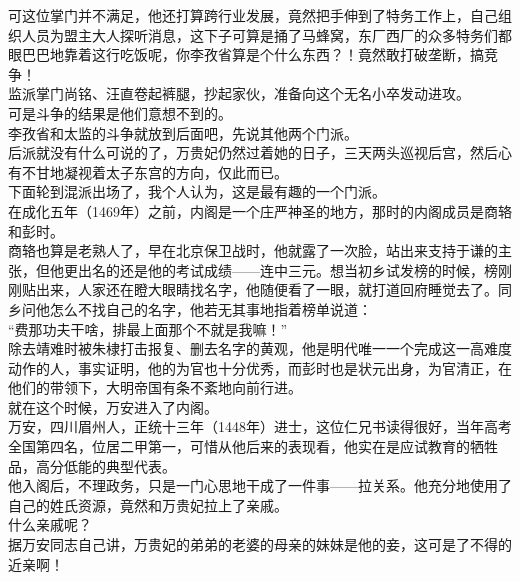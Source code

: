 \begin{multicols}{\theparacolNo}
可这位掌门并不满足，他还打算跨行业发展，竟然把手伸到了特务工作上，自己组织人员为盟主大人探听消息，这下子可算是捅了马蜂窝，东厂西厂的众多特务们都眼巴巴地靠着这行吃饭呢，你李孜省算是个什么东西？！竟然敢打破垄断，搞竞争！\\

监派掌门尚铭、汪直卷起裤腿，抄起家伙，准备向这个无名小卒发动进攻。\\

可是斗争的结果是他们意想不到的。\\

李孜省和太监的斗争就放到后面吧，先说其他两个门派。\\

后派就没有什么可说的了，万贵妃仍然过着她的日子，三天两头巡视后宫，然后心有不甘地凝视着太子东宫的方向，仅此而已。\\

下面轮到混派出场了，我个人认为，这是最有趣的一个门派。\\

在成化五年（1469年）之前，内阁是一个庄严神圣的地方，那时的内阁成员是商辂和彭时。\\

商辂也算是老熟人了，早在北京保卫战时，他就露了一次脸，站出来支持于谦的主张，但他更出名的还是他的考试成绩——连中三元。想当初乡试发榜的时候，榜刚刚贴出来，人家还在瞪大眼睛找名字，他随便看了一眼，就打道回府睡觉去了。同乡问他怎么不找自己的名字，他若无其事地指着榜单说道：\\

“费那功夫干啥，排最上面那个不就是我嘛！”\\

除去靖难时被朱棣打击报复、删去名字的黄观，他是明代唯一一个完成这一高难度动作的人，事实证明，他的为官也十分优秀，而彭时也是状元出身，为官清正，在他们的带领下，大明帝国有条不紊地向前行进。\\

就在这个时候，万安进入了内阁。\\

万安，四川眉州人，正统十三年（1448年）进士，这位仁兄书读得很好，当年高考全国第四名，位居二甲第一，可惜从他后来的表现看，他实在是应试教育的牺牲品，高分低能的典型代表。\\

他入阁后，不理政务，只是一门心思地干成了一件事——拉关系。他充分地使用了自己的姓氏资源，竟然和万贵妃拉上了亲戚。\\

什么亲戚呢？\\

据万安同志自己讲，万贵妃的弟弟的老婆的母亲的妹妹是他的妾，这可是了不得的近亲啊！\\


\end{multicols}
